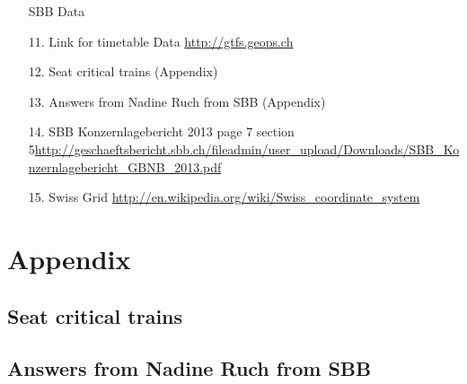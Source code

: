 \documentclass[11pt]{article}
\begin{document}
\begin{itemize}
SBB Data\newline

\item[11.] Link for timetable Data \url{http://gtfs.geops.ch}\newline
\item[12.] Seat critical trains (Appendix)\newline
\item[13.] Answers from Nadine Ruch from SBB (Appendix)\newline

\item[14.] SBB Konzernlagebericht 2013 page 7 section 5\url{http://geschaeftsbericht.sbb.ch/fileadmin/user_upload/Downloads/SBB_Konzernlagebericht_GBNB_2013.pdf}\newline

\item[15.]Swiss Grid \url{http://en.wikipedia.org/wiki/Swiss_coordinate_system}
\end{itemize}

\newpage

\section{Appendix}

\subsection{Seat critical trains}


\begin{figure}[h]

\end{figure}
\newpage
\subsection{Answers from Nadine Ruch from SBB}
\begin{figure}[h]

\end{figure}
\end{document}
